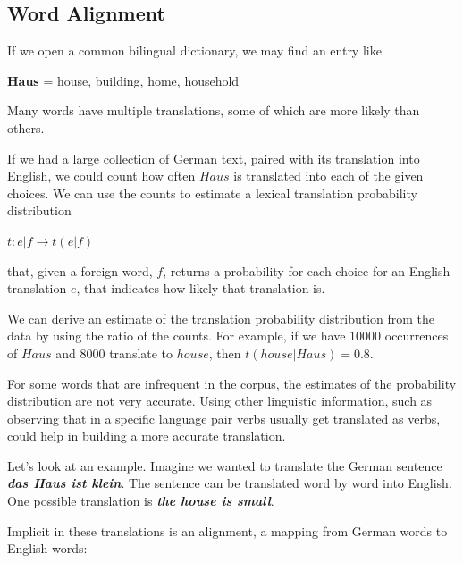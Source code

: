 \documentclass[11pt]{report}
\theoremstyle{plain}
\begin{document}
{\subsection{Word Alignment}

If we open a common bilingual dictionary, we may find an entry
like\\
\begin{center}
\textbf{Haus} = house, building, home, household\\
\end{center}
Many words have multiple translations, some of which are more likely
than others.

If we had a large collection of German text, paired with its
translation into English, we could count how often $Haus$ is
translated into each of the given choices. We can use the counts to
estimate a lexical translation probability distribution

\begin{center}
$t : e|f \rightarrow t(e|f)$
\end{center}

that, given a foreign word, $f$, returns a probability for each
choice for an English translation $e$, that indicates how likely
that translation is.


We can derive an estimate of the translation probability
distribution from the data by using the ratio of the counts. For
example, if we have $10000$ occurrences of $Haus$ and $8000$
translate to $house$, then $t(house|Haus)=0.8$.

For some words that are infrequent in the corpus, the estimates of
the probability distribution are not very accurate. Using other
linguistic information, such as observing that in a specific
language pair verbs usually get translated as verbs, could help in
building a more accurate translation.

Let's look at an example. Imagine we wanted to translate the German
sentence \textbf{\emph{das Haus ist klein}}. The sentence can be
translated word by word into English. One possible translation is
\textbf{\emph{the house is small}}.


Implicit in these translations is an alignment, a mapping from
German words to English words:

}
\end{document}
